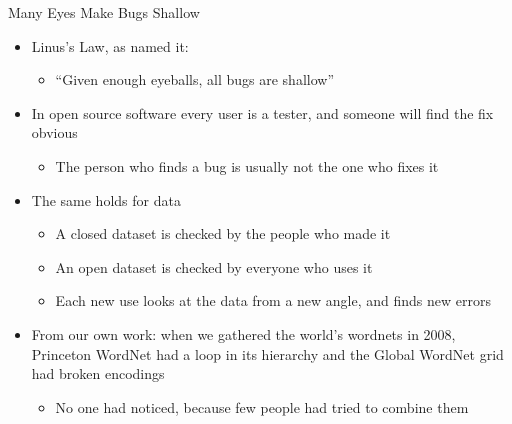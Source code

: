 \documentclass[aspectratio=169]{beamer}
\begin{document}
\begin{frame}{Many Eyes Make Bugs Shallow}
\begin{itemize}
  \item Linus's Law, as \citet{raymond1999cathedral} named it:
    \begin{itemize}
    \item ``Given enough eyeballs, all bugs are shallow''
    \end{itemize}
  \item In open source software every user is a tester, and someone will
    find the fix obvious
    \begin{itemize}
    \item The person who finds a bug is usually not the one who fixes it
    \end{itemize}
  \item The same holds for data
    \begin{itemize}
    \item A closed dataset is checked by the people who made it
    \item An open dataset is checked by everyone who uses it
    \item Each new use looks at the data from a new angle, and finds new errors
    \end{itemize}
  \item From our own work: when we gathered the world's wordnets in 2008,
    Princeton WordNet had a loop in its hierarchy and the Global WordNet grid
    had broken encodings
    \begin{itemize}
    \item No one had noticed, because few people had tried to combine them
    \end{itemize}
\end{itemize}
\end{frame}
\end{document}
